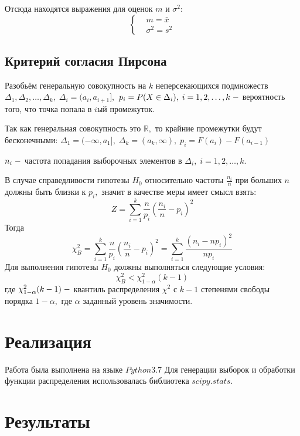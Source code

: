 \documentclass[a4]{article}
\begin{document}
Отсюда находятся выражения для оценок $m$ и $\sigma^2$:
\begin{equation}
\begin{cases}
&  m= \bar{x}\\ 
&  \sigma^{2} = s^{2}
\end{cases}
\end{equation}

\subsection{Критерий согласия Пирсона}
Разобьём генеральную совокупность на $k$ неперсекающихся подмножеств $\Delta_1, \Delta_2,\ldots, \Delta_k,\;\Delta_i = (a_i,a_{i+1}],$ $p_i = P(X\in\Delta_i),\;i=1,2,\ldots,k\; \--$ вероятность того, что точка попала в $i$ый промежуток.

Так как генеральная совокупность это $\mathbb{R},$ то крайние промежутки будут бесконечными: $\Delta_1=(-\infty,a_1],\;\Delta_k=(a_k,\infty),\;p_i = F(a_i)-F(a_{i-1})$

$n_i\;\--$ частота попадания выборочных элементов в $\Delta_i,\;i=1,2,\ldots,k.$

В случае справедливости гипотезы $H_0$ относительно частоты $\frac{n_i}{n}$ при больших $n$ должны быть близки к $p_i,$ значит в качестве меры имеет смысл взять: 
\begin{equation}
    Z = \sum\limits_{i=1}^k\frac{n}{p_i}\left(\frac{n_i}{n}-p_i\right)^2
\end{equation}
Тогда
\begin{equation}
    \chi^2_B=\sum\limits_{i=1}^k\frac{n}{p_i}\left(\frac{n_i}{n}-p_i\right)^2=\sum\limits_{i=1}^k\frac{(n_i-np_i)^2}{np_i}
\end{equation}
Для выполнения гипотезы $H_0$ должны выполняться следующие условия:
\begin{equation}
    \chi_B^2 < \chi_{1-\alpha}^2(k-1)
\end{equation}
где $\chi_{1-\alpha}^2(k-1)\;\--$ квантиль распределения $\chi^2$ с $k-1$ степенями свободы порядка $1-\alpha,$ где $\alpha$ заданный уровень значимости.
\section{Реализация}
Работа была выполнена на языке $Python 3.7$
Для генерации выборок и обработки функции распределения использовалась библиотека $scipy.stats$.

\section{Результаты}
\end{document}
